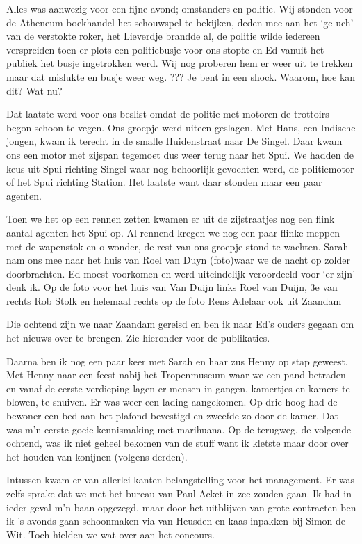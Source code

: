 \documentclass[10pt,twoside,openright]{memoir}
\begin{document}
Alles was aanwezig voor een fijne avond; omstanders en politie. Wij stonden voor de Atheneum boekhandel het schouwspel te bekijken, deden mee aan het ‘ge-uch’ van de verstokte roker, het Lieverdje brandde al, de politie wilde iedereen verspreiden toen er plots een politiebusje voor ons stopte en Ed vanuit het publiek het busje ingetrokken werd. Wij nog proberen hem er weer uit te trekken maar dat mislukte en busje weer weg. ??? Je bent in een shock. Waarom, hoe kan dit? Wat nu? 

Dat laatste werd voor ons beslist omdat de politie met motoren de trottoirs begon schoon te vegen. Ons groepje werd uiteen geslagen. Met Hans, een Indische jongen, kwam ik terecht in de smalle Huidenstraat naar De Singel. Daar kwam ons een motor met zijspan tegemoet dus weer terug naar het Spui. We hadden de keus uit Spui richting Singel waar nog behoorlijk gevochten werd, de politiemotor of het Spui richting Station. Het laatste want daar stonden maar een paar agenten. 

Toen we het op een rennen zetten kwamen er uit de zijstraatjes nog een flink aantal agenten het Spui op. Al rennend kregen we nog een paar flinke meppen met de wapenstok en o wonder, de rest van ons groepje stond te wachten. Sarah nam ons mee naar het huis van Roel van Duyn (foto)waar we de nacht op zolder doorbrachten. Ed moest voorkomen en werd uiteindelijk veroordeeld voor ‘er zijn’ denk ik. Op de foto voor het huis van Van Duijn links Roel van Duijn, 3e van rechts Rob Stolk en helemaal rechts op de foto Rens Adelaar ook uit Zaandam

Die ochtend zijn we naar Zaandam gereisd en ben ik naar Ed’s ouders gegaan om het nieuws over te brengen. Zie hieronder voor de publikaties.

Daarna ben ik nog een paar keer met Sarah en haar zus Henny op stap geweest. Met Henny naar een feest nabij het Tropenmuseum waar we een pand betraden en vanaf de eerste verdieping lagen er mensen in gangen, kamertjes en kamers te blowen, te snuiven. Er was weer een lading aangekomen. Op drie hoog had de bewoner een bed aan het plafond bevestigd en zweefde zo door de kamer. Dat was m’n eerste goeie kennismaking met marihuana. Op de terugweg, de volgende ochtend, was ik niet geheel bekomen van de stuff want ik kletste maar door over het houden van konijnen (volgens derden).

Intussen kwam er van allerlei kanten belangstelling voor het management. Er was zelfs sprake dat we met het bureau van Paul Acket in zee zouden gaan. Ik had in ieder geval m’n baan opgezegd, maar door het uitblijven van grote contracten ben ik ’s avonds gaan schoonmaken via van Heusden en kaas inpakken bij Simon de Wit. Toch hielden we wat over aan het concours.
\end{document}
